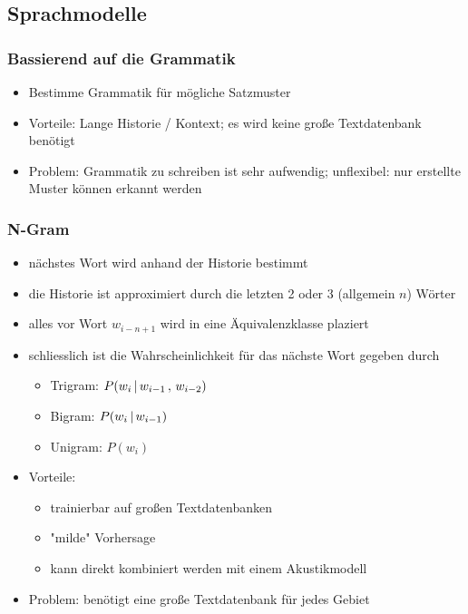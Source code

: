 \subsection{Sprachmodelle}

\subsubsection*{Bassierend auf die Grammatik}

\begin{itemize}
\item Bestimme Grammatik für mögliche Satzmuster
\item Vorteile: Lange Historie / Kontext; es wird keine große Textdatenbank benötigt
\item Problem: Grammatik zu schreiben ist sehr aufwendig; unflexibel: nur erstellte Muster können erkannt werden
\end{itemize}

\subsubsection*{N-Gram}

\begin{itemize}
\item nächstes Wort wird anhand der Historie bestimmt
\item die Historie ist approximiert durch die letzten 2 oder 3 (allgemein $n$) Wörter
\item alles vor Wort $w_{i-n+1}$ wird in eine Äquivalenzklasse plaziert
\item schliesslich ist die Wahrscheinlichkeit für das nächste Wort gegeben durch
\begin{itemize}
\item Trigram: $P(w_i \, | \, w_{i-1} \, , \, w_{i-2})$
\item Bigram: $P(w_i \, | \, w_{i-1})$
\item Unigram: $P(w_i)$
\end{itemize}
\item Vorteile:
\begin{itemize}
\item trainierbar auf großen Textdatenbanken
\item "{}milde"{} Vorhersage
\item kann direkt kombiniert werden mit einem Akustikmodell
\end{itemize}
\item Problem: benötigt eine große Textdatenbank für jedes Gebiet
\end{itemize}


